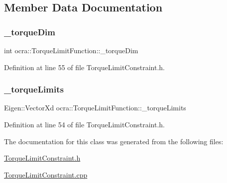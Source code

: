 \subsection{Member Data Documentation}
\hypertarget{classocra_1_1TorqueLimitFunction_ae7eed81decd37aa8bb6baeb47c5fb4d0}{}\label{classocra_1_1TorqueLimitFunction_ae7eed81decd37aa8bb6baeb47c5fb4d0} 
\subsubsection{\texorpdfstring{\+\_\+torque\+Dim}{\_torqueDim}}
{\footnotesize\ttfamily int ocra\+::\+Torque\+Limit\+Function\+::\+\_\+torque\+Dim\hspace{0.3cm}{\ttfamily [protected]}}



Definition at line 55 of file Torque\+Limit\+Constraint.\+h.

\hypertarget{classocra_1_1TorqueLimitFunction_a929154bb1273971f123d12ce810fd375}{}\label{classocra_1_1TorqueLimitFunction_a929154bb1273971f123d12ce810fd375} 
\subsubsection{\texorpdfstring{\+\_\+torque\+Limits}{\_torqueLimits}}
{\footnotesize\ttfamily Eigen\+::\+Vector\+Xd ocra\+::\+Torque\+Limit\+Function\+::\+\_\+torque\+Limits\hspace{0.3cm}{\ttfamily [protected]}}



Definition at line 54 of file Torque\+Limit\+Constraint.\+h.



The documentation for this class was generated from the following files\+:\begin{DoxyCompactItemize}
\item 
\hyperlink{TorqueLimitConstraint_8h}{Torque\+Limit\+Constraint.\+h}\item 
\hyperlink{TorqueLimitConstraint_8cpp}{Torque\+Limit\+Constraint.\+cpp}\end{DoxyCompactItemize}
